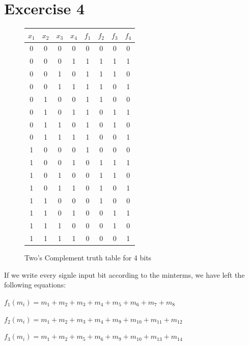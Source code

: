 
%

\section{Excercise 4}

\begin{figure}[!] %
\begin{centering}
\begin{tabular}{|c|c|c|c|c|c|c|c|}
\hline
$x_{1}$  & $x_{2}$  & $x_{3}$  & $x_{4}$  & $f_{1}$  & $f_{2}$  & $f_{3}$  & $f_{4}$\tabularnewline
\hline
\hline
0  & 0  & 0  & 0  & 0  & 0  & 0  & 0\tabularnewline
\hline
0  & 0  & 0  & 1  & 1  & 1  & 1  & 1\tabularnewline
\hline
0  & 0  & 1  & 0  & 1  & 1  & 1  & 0\tabularnewline
\hline
0  & 0  & 1  & 1  & 1  & 1  & 0  & 1\tabularnewline
\hline
0  & 1  & 0  & 0  & 1  & 1  & 0  & 0\tabularnewline
\hline
0  & 1  & 0  & 1  & 1  & 0  & 1  & 1\tabularnewline
\hline
0  & 1  & 1  & 0  & 1  & 0  & 1  & 0\tabularnewline
\hline
0  & 1  & 1  & 1  & 1  & 0  & 0  & 1\tabularnewline
\hline
1  & 0  & 0  & 0  & 1  & 0  & 0  & 0\tabularnewline
\hline
1  & 0  & 0  & 1  & 0  & 1  & 1  & 1\tabularnewline
\hline
1  & 0  & 1  & 0  & 0  & 1  & 1  & 0\tabularnewline
\hline
1  & 0  & 1  & 1  & 0  & 1  & 0  & 1\tabularnewline
\hline
1  & 1  & 0  & 0  & 0  & 1  & 0  & 0\tabularnewline
\hline
1  & 1  & 0  & 1  & 0  & 0  & 1  & 1\tabularnewline
\hline
1  & 1  & 1  & 0  & 0  & 0  & 1  & 0\tabularnewline
\hline
1  & 1  & 1  & 1  & 0  & 0  & 0  & 1\tabularnewline
\hline
\end{tabular}
\par\end{centering}
\caption{Two's Complement truth table for 4 bits}
\end{figure}

If we write every signle input bit according to the minterms, we have
left the following equations:
\begin{center}
$f_{1}(m_{i})=m_{1}+m_{2}+m_{3}+m_{4}+m_{5}+m_{6}+m_{7}+m_{8}$
\par\end{center}

\begin{center}
$f_{2}(m_{i})=m_{1}+m_{2}+m_{3}+m_{4}+m_{9}+m_{10}+m_{11}+m_{12}$
\par\end{center}

\begin{center}
$f_{3}(m_{i})=m_{1}+m_{2}+m_{5}+m_{6}+m_{9}+m_{10}+m_{13}+m_{14}$
\par\end{center}


